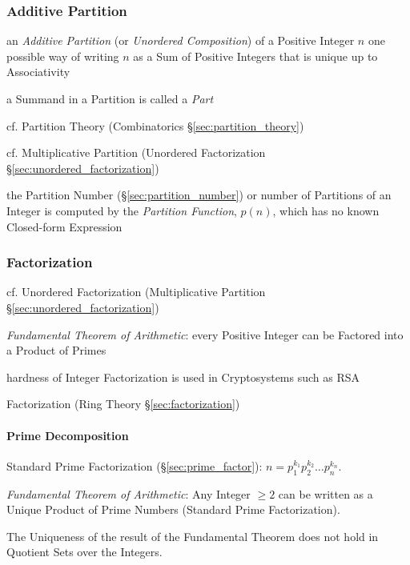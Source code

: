 \subsubsection{Additive Partition}\label{sec:integer_partition}

an \emph{Additive Partition} (or \emph{Unordered Composition}) of a Positive
Integer $n$ one possible way of writing $n$ as a Sum of Positive Integers that
is unique up to Associativity

a Summand in a Partition is called a \emph{Part}

cf. Partition Theory (Combinatorics \S\ref{sec:partition_theory})

cf. Multiplicative Partition (Unordered Factorization
\S\ref{sec:unordered_factorization})

the Partition Number (\S\ref{sec:partition_number}) or number of Partitions of
an Integer is computed by the \emph{Partition Function}, $p(n)$, which has no
known Closed-form Expression



\subsubsection{Factorization}\label{sec:integer_factorization}

cf. Unordered Factorization (Multiplicative Partition
\S\ref{sec:unordered_factorization})

\emph{Fundamental Theorem of Arithmetic}: every Positive Integer can be
Factored into a Product of Primes

hardness of Integer Factorization is used in Cryptosystems such as RSA

\fist Factorization (Ring Theory \S\ref{sec:factorization})



\paragraph{Prime Decomposition}\label{sec:prime_decomposition}\hfill

Standard Prime Factorization (\S\ref{sec:prime_factor}):
$n = p_1^{k_1} p_2^{k_2} \ldots p_n^{k_n}$.

\emph{Fundamental Theorem of Arithmetic}: Any Integer $\geq 2$ can be
written as a Unique Product of Prime Numbers (Standard Prime
Factorization).

The Uniqueness of the result of the Fundamental Theorem does not hold
in Quotient Sets over the Integers.



